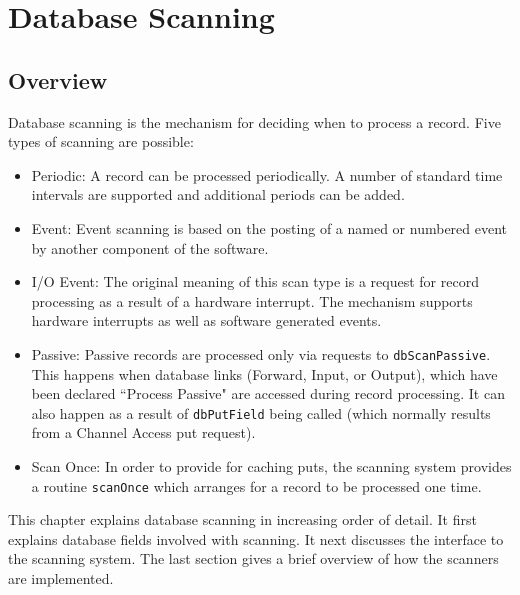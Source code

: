 \chapter{Database Scanning}
\label{chap:Database Scanning}

\section{Overview}

Database scanning is the mechanism for deciding when to process a record.
Five types of scanning are possible:

\begin{itemize}
\item Periodic: A record can be processed periodically.
A number of standard time intervals are supported and additional periods can be added.

\item Event: Event scanning is based on the posting of a named or numbered event by another component of the software.

\item I/O Event: The original meaning of this scan type is a request for record processing as a result of a hardware interrupt.
The mechanism supports hardware interrupts as well as software generated events.

\item Passive: Passive records are processed only via requests to \verb|dbScanPassive|.
This happens when database links (Forward, Input, or Output), which have been declared ``Process Passive" are accessed during record processing.
It can also happen as a result of \verb|dbPutField| being called (which normally results from a Channel Access put request).

\item Scan Once: In order to provide for caching puts, the scanning system provides a routine \verb|scanOnce| which arranges for a record to be processed one time.

\end{itemize}

This chapter explains database scanning in increasing order of detail.
It first explains database fields involved with scanning.
It next discusses the interface to the scanning system.
The last section gives a brief overview of how the scanners are implemented.

